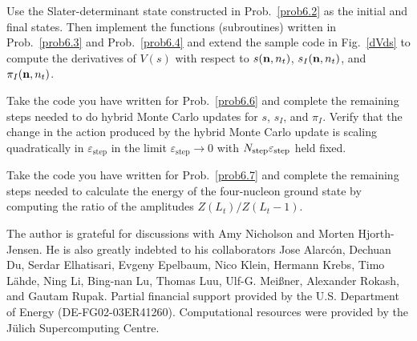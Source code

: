 \begin{prob}
\label{prob6.6}
Use the Slater-determinant state constructed in Prob.~\ref{prob6.2} as the initial and final
states.  Then implement the functions (subroutines) written in Prob.~\ref{prob6.3} and Prob.~\ref{prob6.4}
and extend the sample code in Fig.~\ref{dVds} to compute the derivatives of $V(s)$ with respect to $s({\bf n},n_t)$, $s_I({\bf n},n_t)$, and $\pi_I({\bf n},n_t)$.
\end{prob}

\begin{prob}
\label{prob6.7}
Take the code you have written for Prob.~\ref{prob6.6} and complete the remaining steps needed to do hybrid Monte Carlo updates for $s$, $s_I$, and $\pi_I$. Verify that the change in the action produced by the hybrid Monte Carlo update
is scaling quadratically in $\varepsilon_{\mathrm{step}}$ in the limit
$\varepsilon_{\mathrm{step}} \rightarrow 0$ with $N_{\rm step}\varepsilon_{\mathrm{step}}$
held fixed.
\end{prob}   

\begin{prob}
\label{prob6.8}
Take the code you have written for Prob.~\ref{prob6.7} and complete the remaining
steps needed to calculate the energy of the four-nucleon ground state by computing the ratio of the amplitudes $Z(L_t)/Z(L_t-1)$.
\end{prob}

\begin{acknowledgement}
The author is grateful for discussions with Amy Nicholson and Morten
Hjorth-Jensen.  He is also greatly indebted to his collaborators Jose
Alarc{\'o}n, Dechuan Du, Serdar Elhatisari, Evgeny Epelbaum, Nico
Klein, Hermann Krebs, Timo L{\"a}hde, Ning Li, Bing-nan Lu, Thomas
Luu, Ulf-G. Mei{\ss}ner, Alexander Rokash, and Gautam Rupak.  Partial
financial support provided by the U.S. Department of Energy
(DE-FG02-03ER41260).  Computational resources were provided by the
J\"{u}lich Supercomputing Centre.
\end{acknowledgement}








